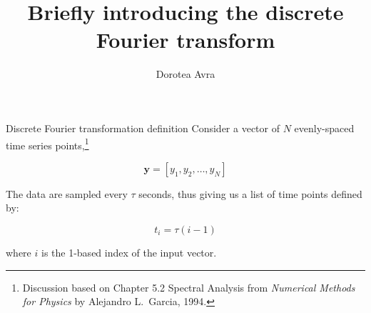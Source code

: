\documentclass[t,xcolor={svgnames},aspectratio=169]{beamer}
\title{Briefly introducing the discrete Fourier transform}
\author{Dorotea Avra}
\begin{document}

\begin{frame}{Discrete Fourier transformation definition}
    Consider a vector of $N$ evenly-spaced time series
    points,\footnote{Discussion based on Chapter 5.2 Spectral Analysis from
    \emph{Numerical Methods for Physics} by Alejandro L.\ Garcia, 1994.}

    \begin{equation}
        \mathbf{y} = [y_1, y_2, \ldots, y_N]
    \end{equation}

    The data are sampled every $\tau$ seconds, thus giving us a list of time
    points defined by:

    \begin{equation}
        t_i = \tau (i - 1)
    \end{equation}

    where $i$ is the 1-based index of the input vector.
\end{frame}
\end{document}

